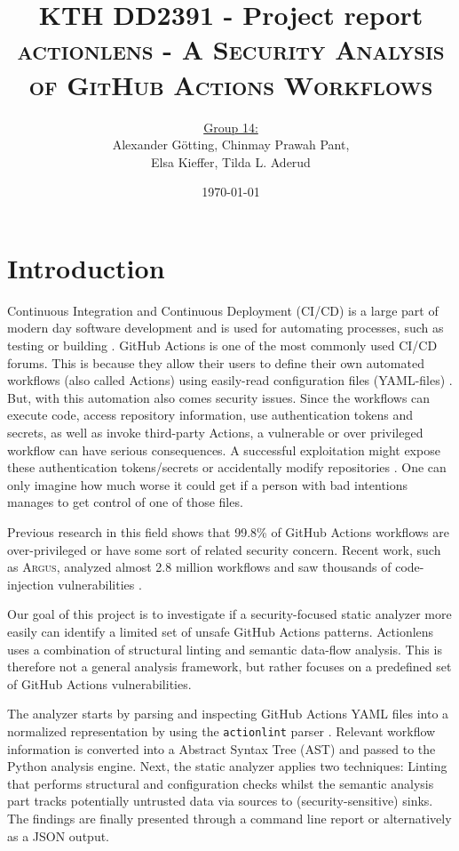 \documentclass{article}
\title{KTH DD2391 - Project report\\[0.3cm]
\scshape{actionlens - A Security Analysis of GitHub Actions Workflows}}
\author{\underline{Group 14:} \\[0.3cm]
Alexander Götting, Chinmay Prawah Pant, \\
Elsa Kieffer, Tilda L. Aderud}
\date{\today}
\begin{document}
\maketitle

\section{Introduction}

Continuous Integration and Continuous Deployment (CI/CD) is a large part of modern day software development and is used for automating processes, such as testing or building \cite{githubcicd}. GitHub Actions is one of the most commonly used CI/CD forums. This is because they allow their users to define their own automated workflows (also called Actions) using easily-read configuration files (YAML-files) \cite{githubactions}. But, with this automation also comes security issues. Since the workflows can execute code, access repository information, use authentication tokens and secrets, as well as invoke third-party Actions, a vulnerable or over privileged workflow can have serious consequences. A successful exploitation might expose these authentication tokens/secrets or accidentally modify repositories \cite{koishybayev2022}. One can only imagine how much worse it could get if a person with bad intentions manages to get control of one of those files.

Previous research in this field shows that 99.8\% of GitHub Actions workflows are over-privileged or have some sort of related security concern. Recent work, such as \textsc{Argus}, analyzed almost 2.8 million workflows and saw thousands of code-injection vulnerabilities \cite{muralee2023}.

Our goal of this project is to investigate if a security-focused static analyzer more easily can identify a limited set of unsafe GitHub Actions patterns. Actionlens uses a combination of structural linting and semantic data-flow analysis. This is therefore not a general analysis framework, but rather focuses on a predefined set of GitHub Actions vulnerabilities.

The analyzer starts by parsing and inspecting GitHub Actions YAML files into a normalized representation by using the \texttt{actionlint} parser \cite{actionlint}. Relevant workflow information is converted into a Abstract Syntax Tree (AST) and passed to the Python analysis engine. Next, the static analyzer applies two techniques: Linting that performs structural and configuration checks whilst the semantic analysis part tracks potentially untrusted data via sources to (security-sensitive) sinks. The findings are finally presented through a command line report or alternatively as a JSON output. 
\end{document}

